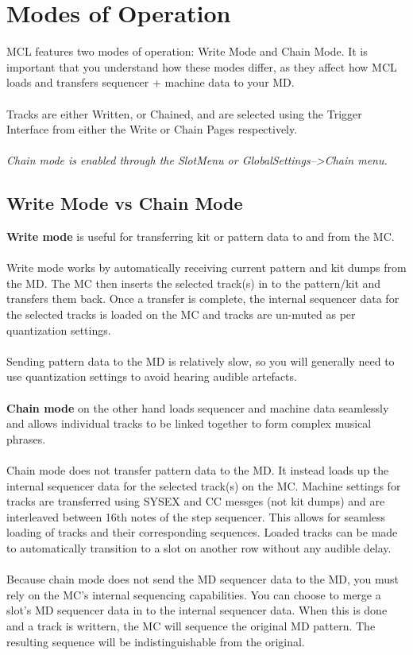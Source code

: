 \chapter{Modes of Operation}
MCL features two modes of operation: Write Mode and Chain Mode. It is important that you understand how these modes differ, as they affect how MCL loads and transfers sequencer + machine data to your MD.\\
\\
Tracks are either Written, or Chained, and are selected using the Trigger Interface from either the Write or Chain Pages respectively. \\
\\
\textit{Chain mode is enabled through the SlotMenu or GlobalSettings-->Chain menu.}

\section{Write Mode vs Chain Mode}
\textbf{Write mode} is useful for transferring kit or pattern data to and from the MC. \\
\\
Write mode works by automatically receiving current pattern and kit dumps from the MD. The MC then inserts the selected track(s) in to the pattern/kit and transfers them back. Once a transfer is complete, the internal sequencer data for the selected tracks is loaded on the MC and tracks are un-muted as per quantization settings.\\
\\
Sending pattern data to the MD is relatively slow, so you will generally need to use quantization settings to avoid hearing audible artefacts.\\
\\
\textbf{Chain mode}  on the other hand loads sequencer and machine data seamlessly and allows individual tracks to be linked together to form complex musical phrases. \\
\\
Chain mode does not transfer pattern data to the MD. It instead  loads up the internal sequencer data for the selected track(s) on the MC. Machine settings for tracks are transferred using SYSEX and CC messges (not kit dumps) and are interleaved between 16th notes of the step sequencer. This allows for seamless loading of tracks and their corresponding sequences. Loaded tracks can be made to automatically transition to a slot on another row without any audible delay. \\
\\
Because chain mode does not send the MD sequencer data to the MD, you must rely on the MC's internal sequencing capabilities. You can choose to merge a slot's MD sequencer data in to the internal sequencer data. When this is done and a track is writtern, the MC will sequence the original MD pattern. The resulting sequence will be indistinguishable from the original.

